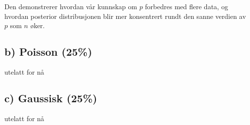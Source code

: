 \documentclass{article}
\begin{document}
 Den demonstrerer hvordan vår kunnskap om \(p\) forbedres med flere data, og hvordan posterior distribusjonen blir mer konsentrert rundt den sanne verdien av \(p\) som \(n\) øker.

\subsection*{b) Poisson (25\%)}
utelatt for nå

\subsection*{c) Gaussisk (25\%)}
utelatt for nå
\end{document}
